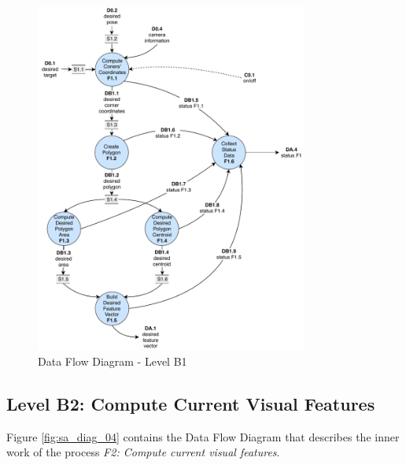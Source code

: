 \begin{figure}[!htb]
	\caption{Data Flow Diagram - Level B1}
	\label{fig:sa_diag_03}
	\centering
	\includegraphics[width=0.8\textwidth]{content/chapter_03/images/sa_diagram_03.pdf}
\end{figure}

\pagebreak

\subsection{Level B2: Compute Current Visual Features}
\label{sec:level-B2}

Figure \ref{fig:sa_diag_04} contains the Data Flow Diagram that describes the inner work of the process \textit{F2: Compute current visual features}.

